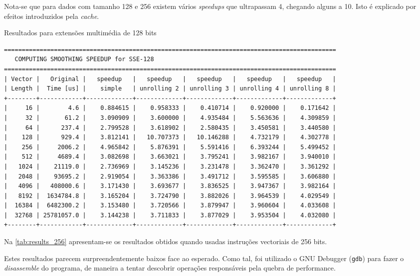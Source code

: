 \documentclass[a4paper]{article}
\begin{document}
	Nota-se que para dados com tamanho 128 e 256 existem vários \textit{speedups} que ultrapassam 4, chegando alguns a 10. Isto é explicado por efeitos introduzidos pela \textit{cache}.
	

	\begin{table}[h]
	\caption{Resultados para extensões multimédia de 128 bits}
	\label{tab:results_128}
	\begin{Verbatim}[fontsize=\small,xleftmargin=-3mm]
=============================================================================================
   COMPUTING SMOOTHING SPEEDUP for SSE-128
=============================================================================================
| Vector |   Original |   speedup   |   speedup   |   speedup   |   speedup   |   speedup   |
| Length |  Time [us] |    simple   | unrolling 2 | unrolling 3 | unrolling 4 | unrolling 8 |
+--------+------------+-------------+-------------+-------------+-------------+-------------+
|     16 |        4.6 |    0.884615 |    0.958333 |    0.410714 |    0.920000 |    0.171642 |
|     32 |       61.2 |    3.090909 |    3.600000 |    4.935484 |    5.563636 |    4.309859 |
|     64 |      237.4 |    2.799528 |    3.618902 |    2.580435 |    3.450581 |    3.440580 |
|    128 |      929.4 |    3.812141 |   10.707373 |   10.146288 |    4.732179 |    4.302778 |
|    256 |     2006.2 |    4.965842 |    5.876391 |    5.591416 |    6.393244 |    5.499452 |
|    512 |     4689.4 |    3.082698 |    3.663021 |    3.795241 |    3.982167 |    3.940010 |
|   1024 |    21119.0 |    2.736969 |    3.145236 |    3.231478 |    3.362470 |    3.361292 |
|   2048 |    93695.2 |    2.919054 |    3.363386 |    3.491712 |    3.595585 |    3.606880 |
|   4096 |   408000.6 |    3.171430 |    3.693677 |    3.836525 |    3.947367 |    3.982164 |
|   8192 |  1634784.8 |    3.165204 |    3.724790 |    3.882026 |    3.964539 |    4.029549 |
|  16384 |  6482300.2 |    3.153480 |    3.720566 |    3.879947 |    3.960604 |    4.033608 |
|  32768 | 25781057.0 |    3.144238 |    3.711833 |    3.877029 |    3.953504 |    4.032080 |
+--------+------------+-------------+-------------+-------------+-------------+-------------+
	\end{Verbatim}
	\end{table}


	Na \autoref{tab:results_256} apresentam-se os resultados obtidos quando usadas instruções vectoriais de 256 bits. 

        Estes resultados parecem surpreendentemente baixos face ao esperado. Como tal, foi utilizado o GNU Debugger (\texttt{gdb}) para fazer o \textit{disassemble} do programa, de maneira a tentar descobrir operações responsáveis pela quebra de performance.
	
\end{document}
